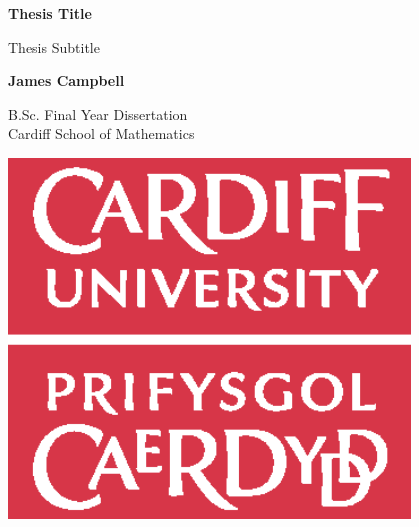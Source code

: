 \begin{titlepage}
    \begin{center}
        \vspace*{5cm}

        \textbf{Thesis Title}

        \vspace{0.5cm}
        Thesis Subtitle

        \vspace{1.5cm}

        \textbf{James Campbell}

        \vfill

        B.Sc. Final Year Dissertation\\

        \vspace{0.5cm}
        Cardiff School of Mathematics

        \vspace{1.5cm}

        \includegraphics[width=0.8\textwidth]{../img/universitylogo.eps}


    \end{center}
\end{titlepage}
